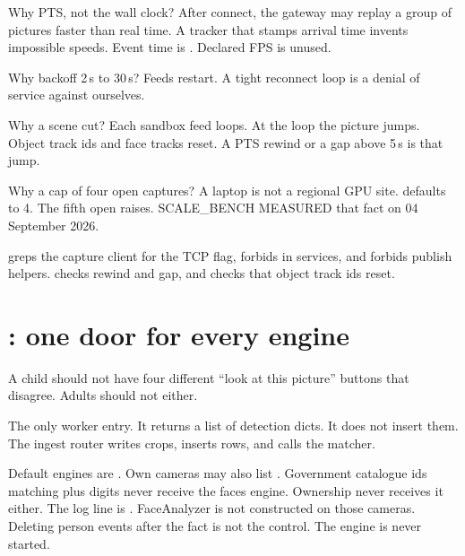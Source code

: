 \documentclass[listings]{csf301-notes}
\begin{document}
Why PTS, not the wall clock? After connect, the gateway may replay a group of pictures faster than real time. A tracker that stamps arrival time invents impossible speeds. Event time is . Declared FPS is unused.

Why backoff 2\,s to 30\,s? Feeds restart. A tight reconnect loop is a denial of service against ourselves.

Why a scene cut? Each sandbox feed loops. At the loop the picture jumps. Object track ids and face tracks reset. A PTS rewind or a gap above 5\,s is that jump.

Why a cap of four open captures? A laptop is not a regional GPU site.  defaults to 4. The fifth open raises. SCALE\_BENCH MEASURED that fact on 04 September 2026.

\begin{implnote}
 greps the capture client for the TCP flag, forbids  in services, and forbids publish helpers.  checks rewind and gap, and checks that object track ids reset.
\end{implnote}

\section{: one door for every engine}
A child should not have four different ``look at this picture'' buttons that disagree. Adults should not either.

\begin{definition}
The only worker entry. It returns a list of detection dicts. It does not insert them. The ingest router writes crops, inserts rows, and calls the matcher.
\end{definition}

\begin{center}\resizebox{0.92\textwidth}{!}{}\end{center}

Default engines are . Own cameras may also list . Government catalogue ids matching  plus digits never receive the faces engine. Ownership  never receives it either. The log line is . FaceAnalyzer is not constructed on those cameras. Deleting person events after the fact is not the control. The engine is never started.
\end{document}
